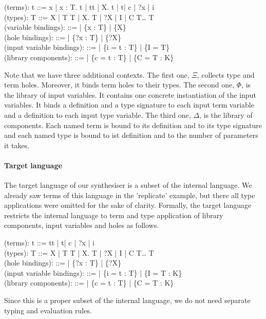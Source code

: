  \begin{plstx}
(terms): t ::= x | \lambda x : T.\; t | t\;t | \Lambda X.\; t | t\;[T] | c | {?x} | i\\
(types): T ::= X | T \rightarrow T | \forall X.\; T | ?X | I | C\; T\;\ldots\; T\\
(variable bindings): \Gamma ::= \emptyset | \Gamma \cup \{x : T\} | \Gamma \cup \{X\}\\
(hole bindings): \Xi ::= \emptyset | \Xi \cup \{{?x} : T\} | \Xi \cup \{{?X}\}\\
(input variable bindings): \Phi ::= \emptyset | \Phi \cup \{i = t : T\} | \Phi \cup \{I = T\}\\
(library components): \Delta ::= \emptyset | \Delta \cup \{c = t : T\} | \Delta \cup \{C = T : K\}\\
\end{plstx}
Note that we have three additional contexts.
The first one, $\Xi$, collects type and term holes. Moreover, it binds term holes to their types.
The second one, $\Phi$, is the library of input variables. It contains one concrete instantiation of the input variables. It binds a definition and a type signature to each input term variable and a definition to each input type variable.
The third one, $\Delta$, is the library of components. Each named term is bound to its definition and to its type signature and each named type is bound to ist definition and to the number of parameters it takes.


\paragraph{Target language} The target language of our synthesiser is a subset of the internal language. We already saw terms of this language in the 'replicate' example, but there all type applications were omitted for the sake of clarity.
Formally, the target language restricts the internal language to term and type application of library components, input variables and holes as follows.
 \begin{plstx}
(terms): t ::= t\;t | t\;[T] | c | ?x | i\\
(types): T ::= X | T \rightarrow T | \forall X.\; T | ?X | I | C\; T\;\ldots\; T\\
(hole bindings): \Xi ::= \emptyset | \Xi \cup \{{?x} : T\} | \Xi \cup \{{?X}\}\\
(input variable bindings): \Phi ::= \emptyset | \Phi \cup \{i = t : T\} | \Phi \cup \{I = T : K\}\\
(library components): \Delta ::= \emptyset | \Delta \cup \{c = t : T\} | \Delta \cup \{C = T : K\}\\
\end{plstx}
Since this is a proper subset of the internal language, we do not need separate typing and evaluation rules.

